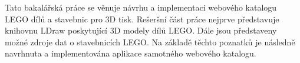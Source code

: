 Tato bakalářská práce se věnuje návrhu a implementaci webového katalogu LEGO dílů a stavebnic pro 3D tisk. Rešeršní část práce nejprve představuje knihovnu LDraw poskytující 3D modely dílů LEGO. Dále jsou představeny možné zdroje dat o stavebnicích LEGO. Na základě těchto poznatků je následně navrhnuta a implementována aplikace samotného webového katalogu. 